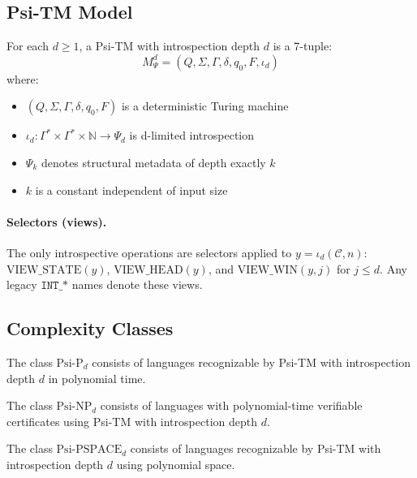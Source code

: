 \subsection{Psi-TM Model}

\begin{definition}
For each $d \geq 1$, a Psi-TM with introspection depth $d$ is a 7-tuple:
$$M_\Psi^d = (Q, \Sigma, \Gamma, \delta, q_0, F, \iota_d)$$
where:
\begin{itemize}
\item $(Q, \Sigma, \Gamma, \delta, q_0, F)$ is a deterministic Turing machine
\item $\iota_d: \Gamma^* \times \Gamma^* \times \mathbb{N} \to \Psi_d$ is d-limited introspection
\item $\Psi_k$ denotes structural metadata of depth exactly $k$
\item $k$ is a constant independent of input size
\end{itemize}
\end{definition}

\paragraph{Selectors (views).} The only introspective operations are selectors applied to $y=\iota_d(\mathcal{C},n)$: $\mathrm{VIEW\_STATE}(y)$, $\mathrm{VIEW\_HEAD}(y)$, and $\mathrm{VIEW\_WIN}(y,j)$ for $j\le d$. Any legacy $\texttt{INT\_*}$ names denote these views.

\subsection{Complexity Classes}

\begin{definition}
The class $\text{Psi-P}_d$ consists of languages recognizable by Psi-TM with introspection depth $d$ in polynomial time.
\end{definition}

\begin{definition}
The class $\text{Psi-NP}_d$ consists of languages with polynomial-time verifiable certificates using Psi-TM with introspection depth $d$.
\end{definition}

\begin{definition}
The class $\text{Psi-PSPACE}_d$ consists of languages recognizable by Psi-TM with introspection depth $d$ using polynomial space.
\end{definition}


